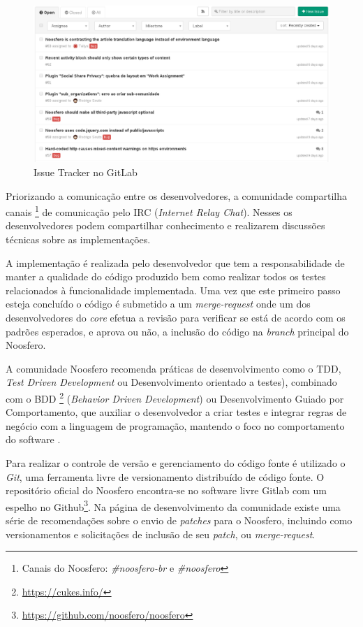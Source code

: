 \begin{figure}[h]
    \centering
    \includegraphics[keepaspectratio=true,scale=0.4]
      {figuras/issueTrackerGitLab.eps}
    \caption{Issue Tracker no GitLab}
    \label{issue-tracker}
\end{figure}

Priorizando a comunicação entre os desenvolvedores, a comunidade compartilha canais \footnote{Canais do Noosfero: \textit{\#noosfero-br} e \textit{\#noosfero}} de comunicação pelo IRC (\textit{Internet Relay Chat}). Nesses os desenvolvedores podem compartilhar conhecimento e realizarem discussões técnicas sobre as implementações.

A implementação é realizada pelo desenvolvedor que tem a responsabilidade de manter a qualidade do código produzido bem como realizar todos os testes relacionados à funcionalidade implementada. Uma vez que este primeiro passo esteja concluído o código é submetido a um \textit{merge-request} onde um dos desenvolvedores do \textit{core} efetua a revisão para verificar se está de acordo com os padrões esperados, e aprova ou não, a inclusão do código na \textit{branch} principal do Noosfero.

A comunidade Noosfero recomenda práticas de desenvolvimento como o TDD, \textit{Test Driven Development} ou Desenvolvimento orientado a testes), combinado com o BDD \footnote{\url{https://cukes.info/}} (\textit{Behavior Driven Development}) ou Desenvolvimento Guiado por Comportamento, que auxiliar o desenvolvedor a criar testes e integrar regras de negócio com a linguagem de programação, mantendo o foco no comportamento do software \cite{north2006introducing}.

Para realizar o controle de versão e gerenciamento do código fonte é utilizado o \textit{Git}, uma ferramenta livre de versionamento distribuído de código fonte. O repositório oficial do Noosfero encontra-se no software livre Gitlab com um espelho no Github\footnote{\url{https://github.com/noosfero/noosfero}}. Na página de desenvolvimento da comunidade existe uma série de recomendações sobre o envio de \textit{patches} para o Noosfero, incluindo como versionamentos e solicitações de inclusão de seu \textit{patch}, ou \textit{merge-request}.

